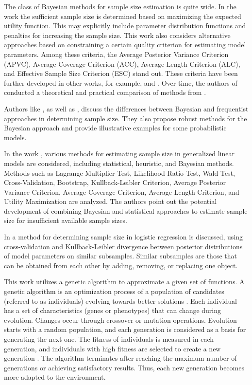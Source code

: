 \documentclass[
11pt,%
tightenlines,%
twoside,%
onecolumn,%
nofloats,%
nobibnotes,%
nofootinbib,%
superscriptaddress,%
noshowpacs,%
centertags]%
{revtex4-2}
\begin{document}
The class of Bayesian methods for sample size estimation is quite wide. In the work \cite{Lindley1997} the sufficient sample size is determined based on maximizing the expected utility function. This may explicitly include parameter distribution functions and penalties for increasing the sample size. This work also considers alternative approaches based on constraining a certain quality criterion for estimating model parameters. Among these criteria, the Average Posterior Variance Criterion (APVC), Average Coverage Criterion (ACC), Average Length Criterion (ALC), and Effective Sample Size Criterion (ESC) stand out. These criteria have been further developed in other works, for example, \cite{PhamGia1997} and \cite{Gelfand2002}. Over time, the authors of \cite{Cao2009} conducted a theoretical and practical comparison of methods from \cite{Adcock1988, Joseph1995, Lindley1997}.

Authors like \cite{Brutti2014}, as well as \cite{Pezeshk2008}, discuss the differences between Bayesian and frequentist approaches in determining sample size. They also propose robust methods for the Bayesian approach and provide illustrative examples for some probabilistic models.

In the work \cite{Grabovoy2022}, various methods for estimating sample size in generalized linear models are considered, including statistical, heuristic, and Bayesian methods. Methods such as Lagrange Multiplier Test, Likelihood Ratio Test, Wald Test, Cross-Validation, Bootstrap, Kullback-Leibler Criterion, Average Posterior Variance Criterion, Average Coverage Criterion, Average Length Criterion, and Utility Maximization are analyzed. The authors point out the potential development of combining Bayesian and statistical approaches to estimate sample size for insufficient available sample sizes.

In \cite{MOTRENKO2014743} a method for determining sample size in logistic regression is discussed, using cross-validation and Kullback-Leibler divergence between posterior distributions of model parameters on similar subsamples. Similar subsamples are those that can be obtained from each other by adding, removing, or replacing one object.

This work utilizes a genetic algorithm \citep{Goldberg1988} to approximate a given set of functions. A genetic algorithm is an optimization process of a population of candidates (referred to as individuals) evolving towards better solutions \citep{Mirjalili2019}. Each individual has a set of characteristics (genes or phenotypes) that can change during evolution. Changes occur through crossover or mutation operations. Evolution starts with a random population, and each generation is considered as a basis for generating the next one. The fitness of individuals is measured in each generation, and individuals with high fitness are selected to create a new generation \citep{Kramer2017}. The algorithm terminates after reaching the maximum number of generations or achieving satisfactory results. Thus, each new generation becomes more adapted to the environment.
\end{document}
